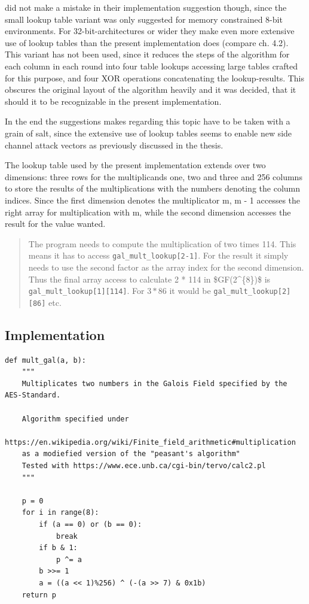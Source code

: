 \cite{rijndael} did not
make a mistake in their implementation suggestion though, since the
small lookup table variant was only suggested for memory constrained
8-bit environments. For 32-bit-architectures or wider they make even more
extensive use of lookup tables than the present implementation does
(compare ch. 4.2). This variant has not been used, since it reduces the
steps of the algorithm for each column in each round into four table
lookups accessing large tables crafted for this purpose, and four \ac{XOR}
operations concatenating the lookup-results. This obscures the original
layout of the algorithm heavily and it was decided, that it should it to be recognizable
in the present implementation.

In the end the suggestions \cite{rijndael} makes regarding this topic have to
be taken with a grain of salt, since the extensive use of lookup tables
seems to enable new side channel attack vectors as previously discussed in the thesis.

The lookup table used by the present implementation extends over two
dimensions: three rows for the multiplicands one, two and three and 256
columns to store the results of the multiplications with the numbers
denoting the column indices. Since the first dimension denotes the
multiplicator m, m - 1 accesses the right array for multiplication with
m, while the second dimension accesses the result for the value wanted.

\begin{quote}
The program needs to compute the multiplication of two times 114. This
means it has to access \lstinline|gal_mult_lookup[2-1]|. For the result it
simply needs to use the second factor as the array index for the second
dimension. Thus the final array access to calculate 2 * 114 in \ac{$GF(2^{8})$} is
\lstinline|gal_mult_lookup[1][114]|. For $3 * 86$ it would be
\lstinline|gal_mult_lookup[2][86]| etc.
\end{quote}

\hypertarget{implementation}{%
\subsection{Implementation}\label{implementation}}

\begin{lstlisting}
def mult_gal(a, b):
    """
    Multiplicates two numbers in the Galois Field specified by the AES-Standard.

    Algorithm specified under
    https://en.wikipedia.org/wiki/Finite_field_arithmetic#multiplication
    as a modiefied version of the "peasant's algorithm"
    Tested with https://www.ece.unb.ca/cgi-bin/tervo/calc2.pl
    """

    p = 0
    for i in range(8):
        if (a == 0) or (b == 0):
            break
        if b & 1:
            p ^= a
        b >>= 1
        a = ((a << 1)%256) ^ (-(a >> 7) & 0x1b)
    return p
\end{lstlisting}

